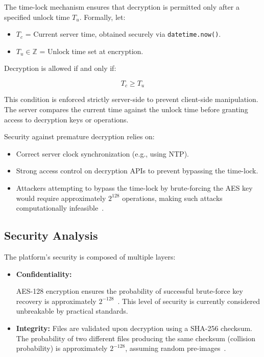 \documentclass[12pt]{article}
\begin{document}
The time-lock mechanism ensures that decryption is permitted only after a specified unlock time $T_u$. Formally, let:

\begin{itemize}
\item $T_c$ = Current server time, obtained securely via \texttt{datetime.now()}.
\item $T_u \in \mathbb{Z}$ = Unlock time set at encryption.
\end{itemize}


Decryption is allowed if and only if:

$$
T_c \geq T_u
$$

This condition is enforced strictly server-side to prevent client-side manipulation. The server compares the current time against the unlock time before granting access to decryption keys or operations.

Security against premature decryption relies on:
\begin{itemize}
\item Correct server clock synchronization (e.g., using NTP).
\item Strong access control on decryption APIs to prevent bypassing the time-lock.
\item Attackers attempting to bypass the time-lock by brute-forcing the AES key would require approximately $2^{128}$ operations, making such attacks computationally infeasible~\cite{hac}.
\end{itemize}

\subsection{Security Analysis}

The platform’s security is composed of multiple layers:

\begin{itemize}
    \item \textbf{Confidentiality:}

AES-128 encryption ensures the probability of successful brute-force key recovery is approximately $2^{-128}$~\cite{hac}. This level of security is currently considered unbreakable by practical standards.
\end{itemize}
\begin{itemize}
    \item \textbf{Integrity:}
     Files are validated upon decryption using a SHA-256 checksum. The probability of two different files producing the same checksum (collision probability) is approximately $2^{-128}$, assuming random pre-images~\cite{stallings2017}.
\end{itemize}
\end{document}
